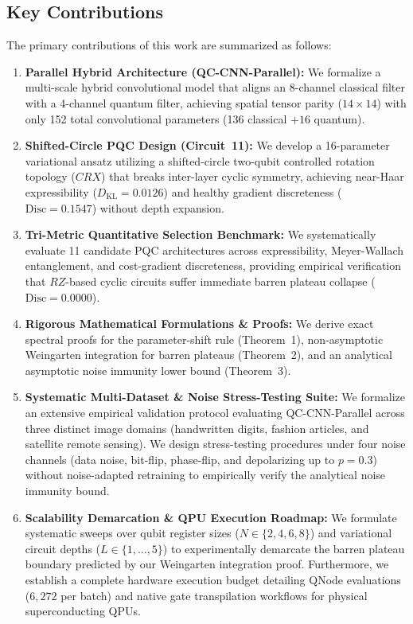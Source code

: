 \documentclass[journal]{IEEEtran}
\begin{document}
\subsection{Key Contributions}
The primary contributions of this work are summarized as follows:
\begin{enumerate}
    \item \textbf{Parallel Hybrid Architecture (QC-CNN-Parallel):} We formalize a multi-scale hybrid convolutional model that aligns an 8-channel classical filter with a 4-channel quantum filter, achieving spatial tensor parity ($14 \times 14$) with only 152 total convolutional parameters (136 classical $+ 16$ quantum).
    \item \textbf{Shifted-Circle PQC Design (Circuit~11):} We develop a 16-parameter variational ansatz utilizing a shifted-circle two-qubit controlled rotation topology ($CRX$) that breaks inter-layer cyclic symmetry, achieving near-Haar expressibility ($D_{\mathrm{KL}} = 0.0126$) and healthy gradient discreteness ($\mathrm{Disc} = 0.1547$) without depth expansion.
    \item \textbf{Tri-Metric Quantitative Selection Benchmark:} We systematically evaluate 11 candidate PQC architectures across expressibility, Meyer-Wallach entanglement, and cost-gradient discreteness, providing empirical verification that $RZ$-based cyclic circuits suffer immediate barren plateau collapse ($\mathrm{Disc} = 0.0000$).
    \item \textbf{Rigorous Mathematical Formulations \& Proofs:} We derive exact spectral proofs for the parameter-shift rule (Theorem~1), non-asymptotic Weingarten integration for barren plateaus (Theorem~2), and an analytical asymptotic noise immunity lower bound (Theorem~3).
    \item \textbf{Systematic Multi-Dataset \& Noise Stress-Testing Suite:} We formalize an extensive empirical validation protocol evaluating QC-CNN-Parallel across three distinct image domains (handwritten digits, fashion articles, and satellite remote sensing). We design stress-testing procedures under four noise channels (data noise, bit-flip, phase-flip, and depolarizing up to $p = 0.3$) without noise-adapted retraining to empirically verify the analytical noise immunity bound.
    \item \textbf{Scalability Demarcation \& QPU Execution Roadmap:} We formulate systematic sweeps over qubit register sizes ($N \in \{2,4,6,8\}$) and variational circuit depths ($L \in \{1,\dots,5\}$) to experimentally demarcate the barren plateau boundary predicted by our Weingarten integration proof. Furthermore, we establish a complete hardware execution budget detailing QNode evaluations ($6,272$ per batch) and native gate transpilation workflows for physical superconducting QPUs.
\end{enumerate}
\end{document}
